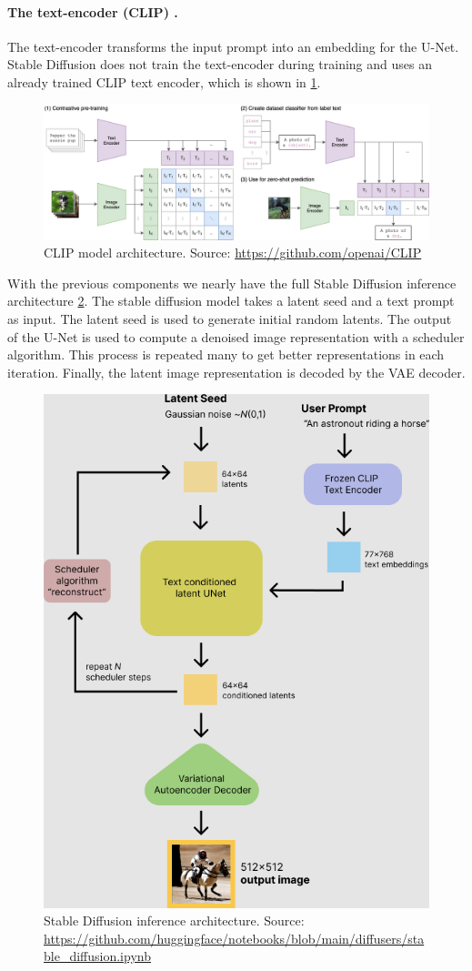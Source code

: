 \paragraph{The text-encoder (CLIP) \cite{radford2021clip}.} The text-encoder transforms the input prompt into an embedding for the U-Net. Stable Diffusion does not train the text-encoder during training and uses an already trained CLIP text encoder, which is shown in \cref{fig:clip}.

\begin{figure}[ht]
    \centering
    \includegraphics[width=\linewidth]{images/clip.png}
    \caption{CLIP model architecture. Source: \url{https://github.com/openai/CLIP}}
    \label{fig:clip}
\end{figure}

With the previous components we nearly have the full Stable Diffusion inference architecture \cref{fig:stable_diffusion}. The stable diffusion model takes a latent seed and a text prompt as input. The latent seed is  used to generate initial random latents. The output of the U-Net is used to compute a denoised image representation with a scheduler algorithm. This process is repeated many to get better representations in each iteration. Finally, the latent image representation is decoded by the VAE decoder.

\begin{figure}[ht]
    \centering
    \includegraphics[width=0.6\linewidth]{images/stable_diffusion.png}
    \caption{Stable Diffusion inference architecture. Source: \url{https://github.com/huggingface/notebooks/blob/main/diffusers/stable_diffusion.ipynb}}
    \label{fig:stable_diffusion}
\end{figure}